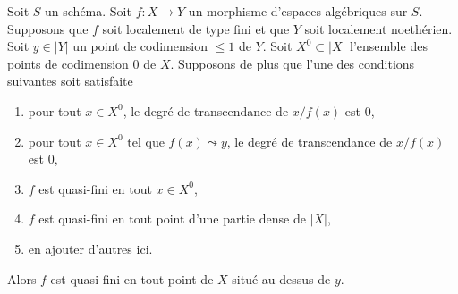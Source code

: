 \begin{lemma}
\label{lemma-quasi-finite-in-codim-1}
Soit $S$ un schéma. Soit $f : X \to Y$ un morphisme d'espaces algébriques
sur $S$. Supposons que $f$ soit localement de type fini et que $Y$ soit
localement noethérien. Soit $y \in |Y|$ un point de codimension $\leq 1$ de $Y$.
Soit $X^0 \subset |X|$ l'ensemble des points de codimension $0$ de $X$.
Supposons de plus que l'une des conditions suivantes soit satisfaite
\begin{enumerate}
\item pour tout $x \in X^0$, le degré de transcendance de $x/f(x)$ est $0$,
\item pour tout $x \in X^0$ tel que $f(x) \leadsto y$,
le degré de transcendance de $x/f(x)$ est $0$,
\item $f$ est quasi-fini en tout $x \in X^0$,
\item $f$ est quasi-fini en tout point d'une partie dense de $|X|$,
\item en ajouter d'autres ici.
\end{enumerate}
Alors $f$ est quasi-fini en tout point de $X$ situé au-dessus de $y$.
\end{lemma}

